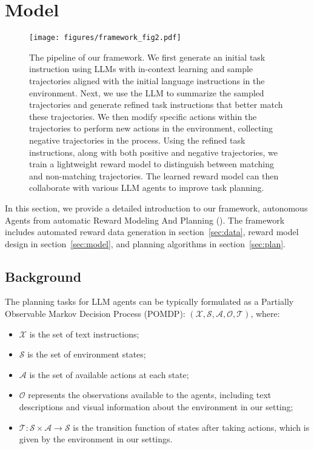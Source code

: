 \section{Model}
\begin{figure*}[t]
  \centering
  \texttt{[image: figures/framework\_fig2.pdf]}
   \caption{
   The pipeline of our \Model framework. We first generate an initial task instruction using LLMs with in-context learning and sample trajectories aligned with the initial language instructions in the environment. Next, we use the LLM to summarize the sampled trajectories and generate refined task instructions that better match these trajectories. We then modify specific actions within the trajectories to perform new actions in the environment, collecting negative trajectories in the process. Using the refined task instructions, along with both positive and negative trajectories, we train a lightweight reward model to distinguish between matching and non-matching trajectories. The learned reward model can then collaborate with various LLM agents to improve task planning.
   }
   \label{fig:pipeline}
\end{figure*}

In this section, we provide a detailed introduction to our framework, autonomous Agents from automatic Reward Modeling And Planning (\Model). The framework includes automated reward data generation in section~\ref{sec:data}, reward model design in section~\ref{sec:model}, and planning algorithms in section~\ref{sec:plan}.

\subsection{Background}
The planning tasks for LLM agents can be typically formulated as a Partially Observable Markov Decision Process (POMDP): $(\mathcal{X}, \mathcal{S}, \mathcal{A}, \mathcal{O}, \mathcal{T})$, where:
\begin{itemize}
    \item $\mathcal{X}$ is the set of text instructions;
    \item $\mathcal{S}$ is the set of environment states;
    \item $\mathcal{A}$ is the set of available actions at each state;
    \item $\mathcal{O}$ represents the observations available to the agents, including text descriptions and visual information about the environment in our setting;
    \item $\mathcal{T}: \mathcal{S} \times \mathcal{A} \rightarrow \mathcal{S}$ is the transition function of states after taking actions, which is given by the environment in our settings. 
\end{itemize}

